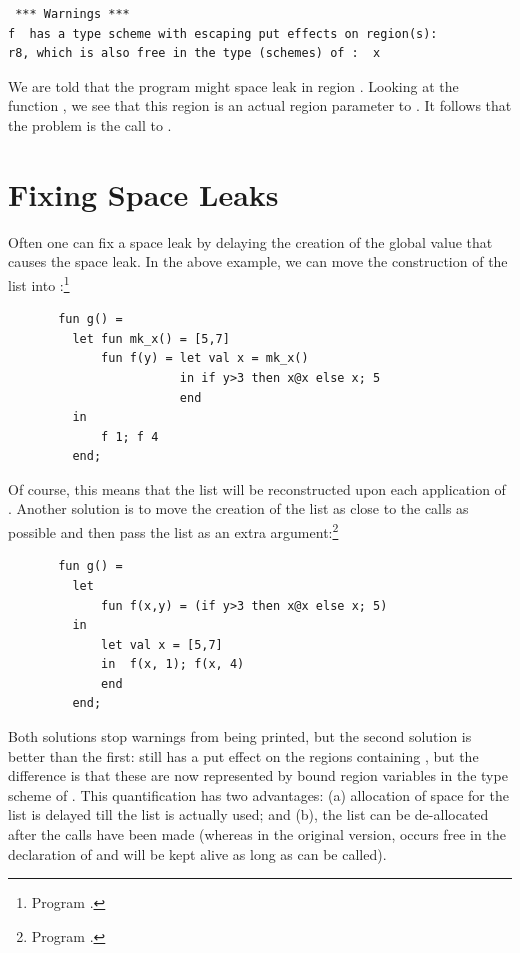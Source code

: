 \documentclass[12pt]{book}
\begin{document}
\begin{verbatim}
 *** Warnings ***
f  has a type scheme with escaping put effects on region(s): 
r8, which is also free in the type (schemes) of :  x
\end{verbatim}
We are told that the program might space
leak in region . Looking at the 
function , we see that this region is an actual
region parameter to . It follows that the problem is the
call to .

\section{Fixing Space Leaks}
Often one can fix a space leak by delaying the creation of the
global value that causes the space leak. In the above example,
we can move the construction of the list into :\footnote{Program .}
\begin{verbatim}
       fun g() = 
         let fun mk_x() = [5,7]
             fun f(y) = let val x = mk_x()
                        in if y>3 then x@x else x; 5 
                        end
         in 
             f 1; f 4
         end;
\end{verbatim}
Of course, this means that the list will be reconstructed upon each application
of . Another solution is to move the creation of the list as close to 
the calls as possible and then pass the list as an extra argument:\footnote{Program .}
\begin{verbatim}
       fun g() = 
         let 
             fun f(x,y) = (if y>3 then x@x else x; 5)
         in 
             let val x = [5,7]
             in  f(x, 1); f(x, 4)
             end
         end;
\end{verbatim}
Both solutions stop warnings from being printed, 
but the second solution is better than the first:  still has a
put effect on the regions containing , but the difference
is that these are now represented by bound region variables in the type scheme of
. This quantification has two advantages: (a) allocation of space for the list is
delayed till the list is actually used; and (b), the list can be de-allocated
after the calls have been made (whereas in the original version,  occurs
free in the declaration of  and will be kept alive as long as  can be called).
\end{document}
